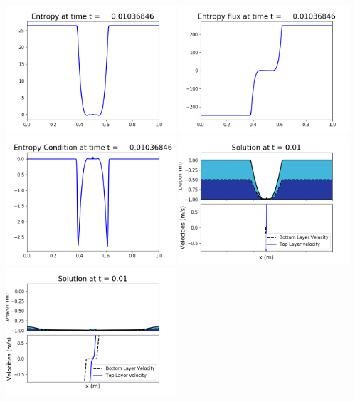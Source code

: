 \documentclass[11pt]{article}
\begin{document}
\vskip 10pt 
\includegraphics[width=0.475\textwidth]{frame0065fig1007.png}
\includegraphics[width=0.475\textwidth]{frame0065fig1008.png}
\vskip 10pt 
\includegraphics[width=0.475\textwidth]{frame0065fig1009.png}
\vskip 10pt 
\includegraphics[width=0.475\textwidth]{frame0066fig1001.png}
\includegraphics[width=0.475\textwidth]{frame0066fig1002.png}
\end{document}
